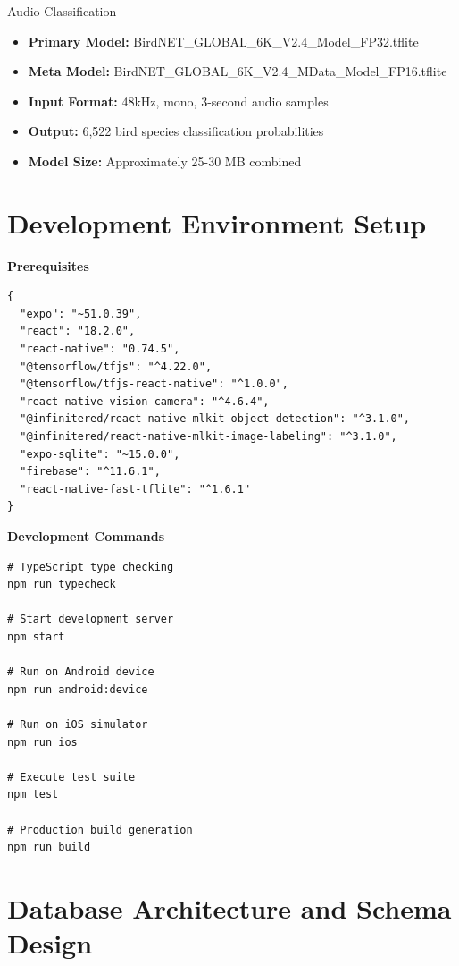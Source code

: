 Audio Classification
\begin{itemize}
    \item \textbf{Primary Model:} BirdNET\_GLOBAL\_6K\_V2.4\_Model\_FP32.tflite
    \item \textbf{Meta Model:} BirdNET\_GLOBAL\_6K\_V2.4\_MData\_Model\_FP16.tflite
    \item \textbf{Input Format:} 48kHz, mono, 3-second audio samples
    \item \textbf{Output:} 6,522 bird species classification probabilities
    \item \textbf{Model Size:} Approximately 25-30 MB combined
\end{itemize}

\section{Development Environment Setup}

\textbf{Prerequisites}
\begin{lstlisting}[caption=Package Versions, label=lst:package_versions]
{
  "expo": "~51.0.39",
  "react": "18.2.0",
  "react-native": "0.74.5",
  "@tensorflow/tfjs": "^4.22.0",
  "@tensorflow/tfjs-react-native": "^1.0.0",
  "react-native-vision-camera": "^4.6.4",
  "@infinitered/react-native-mlkit-object-detection": "^3.1.0",
  "@infinitered/react-native-mlkit-image-labeling": "^3.1.0",
  "expo-sqlite": "~15.0.0",
  "firebase": "^11.6.1",
  "react-native-fast-tflite": "^1.6.1"
}
\end{lstlisting}

\textbf{Development Commands}
\begin{lstlisting}[caption=Development Scripts, label=lst:dev_scripts]
# TypeScript type checking
npm run typecheck

# Start development server
npm start

# Run on Android device
npm run android:device

# Run on iOS simulator  
npm run ios

# Execute test suite
npm test

# Production build generation
npm run build
\end{lstlisting}

\section{Database Architecture and Schema Design}

